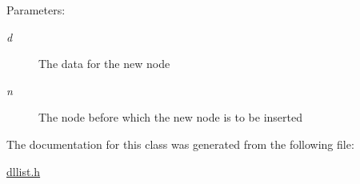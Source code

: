 \begin{Desc}
\item[Parameters:]
\begin{description}
\item[{\em d}]The data for the new node \item[{\em n}]The node before which the new node is to be inserted \end{description}
\end{Desc}


The documentation for this class was generated from the following file:\begin{CompactItemize}
\item 
\hyperlink{dllist_8h}{dllist.h}\end{CompactItemize}
